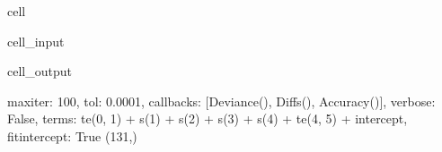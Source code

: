 \documentclass[letterpaper,10pt,english]{jupyterBook}
\begin{document}
\begin{sphinxuseclass}{cell}\begin{sphinxVerbatimInput}

\begin{sphinxuseclass}{cell_input}
\begin{sphinxVerbatim}[commandchars=\\\{\}]
\end{sphinxVerbatim}

\end{sphinxuseclass}\end{sphinxVerbatimInput}
\begin{sphinxVerbatimOutput}

\begin{sphinxuseclass}{cell_output}
\begin{sphinxVerbatim}[commandchars=\\\{\}]
\PYGZob{}\PYGZsq{}max\PYGZus{}iter\PYGZsq{}: 100, \PYGZsq{}tol\PYGZsq{}: 0.0001, \PYGZsq{}callbacks\PYGZsq{}: [Deviance(), Diffs(), Accuracy()], \PYGZsq{}verbose\PYGZsq{}: False, \PYGZsq{}terms\PYGZsq{}: te(0, 1) + s(1) + s(2) + s(3) + s(4) + te(4, 5) + intercept, \PYGZsq{}fit\PYGZus{}intercept\PYGZsq{}: True\PYGZcb{}
(131,)
\end{sphinxVerbatim}

\end{sphinxuseclass}\end{sphinxVerbatimOutput}

\end{sphinxuseclass}
\end{document}
